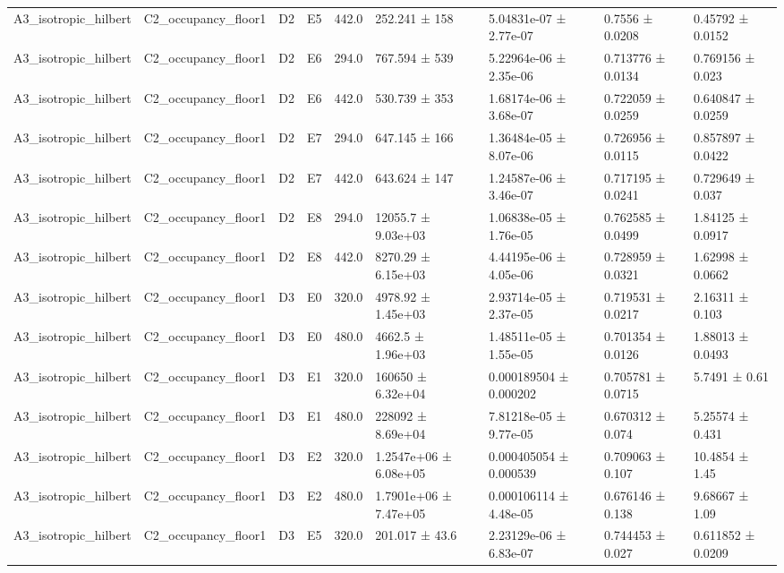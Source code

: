 \begin{table}
\begin{tabular}{lllllllll}
A3\_isotropic\_hilbert & C2\_occupancy\_floor1 & D2 & E5 & 442.0 & 252.241 ± 158 & 5.04831e-07 ± 2.77e-07 & 0.7556 ± 0.0208 & 0.45792 ± 0.0152 \\
A3\_isotropic\_hilbert & C2\_occupancy\_floor1 & D2 & E6 & 294.0 & 767.594 ± 539 & 5.22964e-06 ± 2.35e-06 & 0.713776 ± 0.0134 & 0.769156 ± 0.023 \\
A3\_isotropic\_hilbert & C2\_occupancy\_floor1 & D2 & E6 & 442.0 & 530.739 ± 353 & 1.68174e-06 ± 3.68e-07 & 0.722059 ± 0.0259 & 0.640847 ± 0.0259 \\
A3\_isotropic\_hilbert & C2\_occupancy\_floor1 & D2 & E7 & 294.0 & 647.145 ± 166 & 1.36484e-05 ± 8.07e-06 & 0.726956 ± 0.0115 & 0.857897 ± 0.0422 \\
A3\_isotropic\_hilbert & C2\_occupancy\_floor1 & D2 & E7 & 442.0 & 643.624 ± 147 & 1.24587e-06 ± 3.46e-07 & 0.717195 ± 0.0241 & 0.729649 ± 0.037 \\
A3\_isotropic\_hilbert & C2\_occupancy\_floor1 & D2 & E8 & 294.0 & 12055.7 ± 9.03e+03 & 1.06838e-05 ± 1.76e-05 & 0.762585 ± 0.0499 & 1.84125 ± 0.0917 \\
A3\_isotropic\_hilbert & C2\_occupancy\_floor1 & D2 & E8 & 442.0 & 8270.29 ± 6.15e+03 & 4.44195e-06 ± 4.05e-06 & 0.728959 ± 0.0321 & 1.62998 ± 0.0662 \\
A3\_isotropic\_hilbert & C2\_occupancy\_floor1 & D3 & E0 & 320.0 & 4978.92 ± 1.45e+03 & 2.93714e-05 ± 2.37e-05 & 0.719531 ± 0.0217 & 2.16311 ± 0.103 \\
A3\_isotropic\_hilbert & C2\_occupancy\_floor1 & D3 & E0 & 480.0 & 4662.5 ± 1.96e+03 & 1.48511e-05 ± 1.55e-05 & 0.701354 ± 0.0126 & 1.88013 ± 0.0493 \\
A3\_isotropic\_hilbert & C2\_occupancy\_floor1 & D3 & E1 & 320.0 & 160650 ± 6.32e+04 & 0.000189504 ± 0.000202 & 0.705781 ± 0.0715 & 5.7491 ± 0.61 \\
A3\_isotropic\_hilbert & C2\_occupancy\_floor1 & D3 & E1 & 480.0 & 228092 ± 8.69e+04 & 7.81218e-05 ± 9.77e-05 & 0.670312 ± 0.074 & 5.25574 ± 0.431 \\
A3\_isotropic\_hilbert & C2\_occupancy\_floor1 & D3 & E2 & 320.0 & 1.2547e+06 ± 6.08e+05 & 0.000405054 ± 0.000539 & 0.709063 ± 0.107 & 10.4854 ± 1.45 \\
A3\_isotropic\_hilbert & C2\_occupancy\_floor1 & D3 & E2 & 480.0 & 1.7901e+06 ± 7.47e+05 & 0.000106114 ± 4.48e-05 & 0.676146 ± 0.138 & 9.68667 ± 1.09 \\
A3\_isotropic\_hilbert & C2\_occupancy\_floor1 & D3 & E5 & 320.0 & 201.017 ± 43.6 & 2.23129e-06 ± 6.83e-07 & 0.744453 ± 0.027 & 0.611852 ± 0.0209 \\

\end{tabular}
\end{table}
